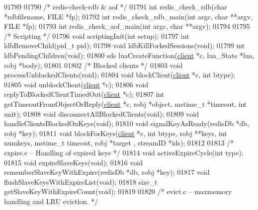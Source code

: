 \begin{DoxyCode}
{{{{{{{01789 
01790 \textcolor{comment}{/* redis-check-rdb & aof */}
01791 \textcolor{keywordtype}{int} redis\_check\_rdb(\textcolor{keywordtype}{char} *rdbfilename, FILE *fp);
01792 \textcolor{keywordtype}{int} redis\_check\_rdb\_main(\textcolor{keywordtype}{int} argc, \textcolor{keywordtype}{char} **argv, FILE *fp);
01793 \textcolor{keywordtype}{int} redis\_check\_aof\_main(\textcolor{keywordtype}{int} argc, \textcolor{keywordtype}{char} **argv);
01794 
01795 \textcolor{comment}{/* Scripting */}
01796 \textcolor{keywordtype}{void} scriptingInit(\textcolor{keywordtype}{int} setup);
01797 \textcolor{keywordtype}{int} ldbRemoveChild(pid\_t pid);
01798 \textcolor{keywordtype}{void} ldbKillForkedSessions(\textcolor{keywordtype}{void});
01799 \textcolor{keywordtype}{int} ldbPendingChildren(\textcolor{keywordtype}{void});
01800 sds luaCreateFunction(\hyperlink{structclient}{client} *c, lua\_State *lua, robj *body);
01801 
01802 \textcolor{comment}{/* Blocked clients */}
01803 \textcolor{keywordtype}{void} processUnblockedClients(\textcolor{keywordtype}{void});
01804 \textcolor{keywordtype}{void} blockClient(\hyperlink{structclient}{client} *c, \textcolor{keywordtype}{int} btype);
01805 \textcolor{keywordtype}{void} unblockClient(\hyperlink{structclient}{client} *c);
01806 \textcolor{keywordtype}{void} replyToBlockedClientTimedOut(\hyperlink{structclient}{client} *c);
01807 \textcolor{keywordtype}{int} getTimeoutFromObjectOrReply(\hyperlink{structclient}{client} *c, robj *object, mstime\_t *timeout, \textcolor{keywordtype}{int} unit);
01808 \textcolor{keywordtype}{void} disconnectAllBlockedClients(\textcolor{keywordtype}{void});
01809 \textcolor{keywordtype}{void} handleClientsBlockedOnKeys(\textcolor{keywordtype}{void});
01810 \textcolor{keywordtype}{void} signalKeyAsReady(redisDb *db, robj *key);
01811 \textcolor{keywordtype}{void} blockForKeys(\hyperlink{structclient}{client} *c, \textcolor{keywordtype}{int} btype, robj **keys, \textcolor{keywordtype}{int} numkeys, mstime\_t timeout, robj *target
      , streamID *ids);
01812 
01813 \textcolor{comment}{/* expire.c -- Handling of expired keys */}
01814 \textcolor{keywordtype}{void} activeExpireCycle(\textcolor{keywordtype}{int} type);
01815 \textcolor{keywordtype}{void} expireSlaveKeys(\textcolor{keywordtype}{void});
01816 \textcolor{keywordtype}{void} rememberSlaveKeyWithExpire(redisDb *db, robj *key);
01817 \textcolor{keywordtype}{void} flushSlaveKeysWithExpireList(\textcolor{keywordtype}{void});
01818 size\_t getSlaveKeyWithExpireCount(\textcolor{keywordtype}{void});
01819 
01820 \textcolor{comment}{/* evict.c -- maxmemory handling and LRU eviction. */}
}}}}}}}
\end{DoxyCode}
